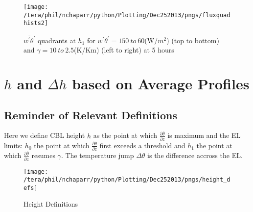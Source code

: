 \begin{figure}[htbp]
%
\caption{ $\overline{w^{'}\theta^{'}}$ quadrants at $h_{1}$ for $w^{'}\theta^{'} = 150 \ to \ 60$(W/$m^{2}$) (top to bottom) and $\gamma = 10 \ to \ 2.5$(K/Km) (left to right) at 5 hours}
\centering
 \texttt{[image: /tera/phil/nchaparr/python/Plotting/Dec252013/pngs/fluxquadhists2]}                 


\label{fig:fluxquadsh1}
\end{figure}

\clearpage

\section{$h$ and  $\Delta h$ based on Average Profiles}
\label{sec:hdeltahavprofs}

\FloatBarrier
\subsection{Reminder of Relevant Definitions}
\FloatBarrier
Here we define \acs{CBL} height $h$  as the point at which 
$\frac{\partial \overline{\theta}}{\partial z}$ is maximum and the \acs{EL} limits: $h_{0}$
the point at which $\frac{\partial \overline{\theta}}{\partial z}$ first exceeds a threshold
and $h_{1}$ the point at which $\frac{\partial \overline{\theta}}{\partial z}$ resumes $\gamma$.
The temperature jump $\Delta \theta$ is the difference accross the \acs{EL}.\\

\begin{figure}[htbp]
    \centering
    \texttt{[image: /tera/phil/nchaparr/python/Plotting/Dec252013/pngs/height\_defs]}
    \caption{Height Definitions}
    \label{fig:hdefs1}   %
\end{figure}

